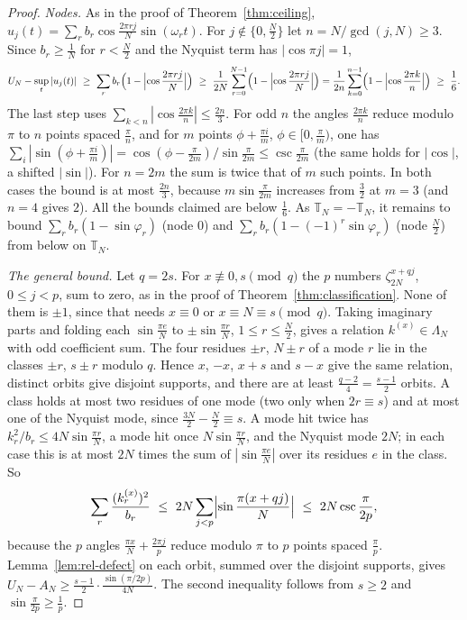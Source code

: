 \begin{proof}
\emph{Nodes.} As in the proof of Theorem~\ref{thm:ceiling}, $u_j(t)=\sum_rb_r\cos\tfrac{2\pi rj}N\sin(\omega_rt)$.
For $j\notin\{0,\tfrac N2\}$ let $n=N/\gcd(j,N)\ge3$. Since $b_r\ge\tfrac1N$ for $r<\tfrac N2$ and the Nyquist
term has $|\cos\pi j|=1$,
\[
  U_N-\sup_t|u_j(t)|\ \ge\ \sum_rb_r\Bigl(1-\Bigl|\cos\frac{2\pi rj}N\Bigr|\Bigr)\ \ge\ \frac1{2N}\sum_{r=0}^{N-1}
  \Bigl(1-\Bigl|\cos\frac{2\pi rj}N\Bigr|\Bigr)=\frac1{2n}\sum_{k=0}^{n-1}\Bigl(1-\Bigl|\cos\frac{2\pi k}n\Bigr|\Bigr)
  \ \ge\ \frac16 .
\]
The last step uses $\sum_{k<n}|\cos\tfrac{2\pi k}n|\le\tfrac{2n}3$. For odd $n$ the angles $\tfrac{2\pi k}n$
reduce modulo $\pi$ to $n$ points spaced $\tfrac\pi n$, and for $m$ points $\phi+\tfrac{\pi i}m$, $\phi\in[0,\tfrac\pi m)$,
one has $\sum_i|\sin(\phi+\tfrac{\pi i}m)|=\cos(\phi-\tfrac\pi{2m})/\sin\tfrac\pi{2m}\le\csc\tfrac\pi{2m}$ (the same
holds for $|\cos|$, a shifted $|\sin|$). For $n=2m$ the sum is twice that of $m$ such points. In both cases the
bound is at most $\tfrac{2n}3$, because $m\sin\tfrac\pi{2m}$ increases from $\tfrac32$ at $m=3$ (and $n=4$
gives $2$). All the bounds claimed are below
$\tfrac16$. As $\mathbb T_N=-\mathbb T_N$, it remains to bound $\sum_rb_r(1-\sin\varphi_r)$ (node $0$) and
$\sum_rb_r(1-(-1)^r\sin\varphi_r)$ (node $\tfrac N2$) from below on $\mathbb T_N$.

\emph{The general bound.} Let $q=2s$. For $x\not\equiv0,s\pmod q$ the $p$ numbers $\zeta_{2N}^{x+qj}$,
$0\le j<p$, sum to zero, as in the proof of Theorem~\ref{thm:classification}. None of them is $\pm1$, since that
needs $x\equiv0$ or $x\equiv N\equiv s\pmod q$. Taking imaginary parts and folding each
$\sin\tfrac{\pi e}N$ to $\pm\sin\tfrac{\pi r}N$, $1\le r\le\tfrac N2$, gives a relation $k^{(x)}\in\Lambda_N$ with
odd coefficient sum. The four residues $\pm r$, $N\pm r$ of a mode $r$ lie in the classes $\pm r$, $s\pm r$
modulo $q$. Hence $x$, $-x$, $x+s$ and $s-x$ give the same relation, distinct orbits give disjoint supports,
and there are at least $\tfrac{q-2}4=\tfrac{s-1}2$ orbits. A class holds at most two residues of one mode (two
only when $2r\equiv s$) and at most one of the Nyquist mode, since $\tfrac{3N}2-\tfrac N2\equiv s$. A mode hit twice
has $k_r^2/b_r\le4N\sin\tfrac{\pi r}N$, a mode hit once $N\sin\tfrac{\pi r}N$, and the Nyquist mode $2N$; in each
case this is at most $2N$ times the sum of $|\sin\tfrac{\pi e}N|$ over its residues $e$ in the class. So
\[
  \sum_r\frac{(k^{(x)}_r)^2}{b_r}\ \le\ 2N\sum_{j<p}\Bigl|\sin\frac{\pi(x+qj)}N\Bigr|\ \le\ 2N\csc\frac\pi{2p},
\]
because the $p$ angles $\tfrac{\pi x}N+\tfrac{2\pi j}p$ reduce modulo $\pi$ to $p$ points spaced $\tfrac\pi p$.
Lemma~\ref{lem:rel-defect} on each orbit, summed over the disjoint supports, gives
$U_N-A_N\ge\tfrac{s-1}2\cdot\tfrac{\sin(\pi/2p)}{4N}$. The second inequality follows from $s\ge2$ and
$\sin\tfrac\pi{2p}\ge\tfrac1p$.


\end{proof}
